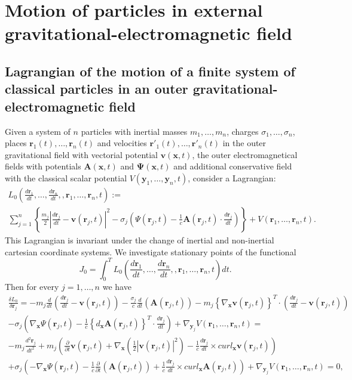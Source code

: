 \documentclass{article}
\theoremstyle{definition}
\theoremstyle{remark}
\renewcommand{\vec}[1]{\mathbf{#1}}
\begin{document}
\section{Motion of particles in external gravitational-electromagnetic field}
\subsection{Lagrangian of the motion of a finite system of classical
particles in an outer gravitational-electromagnetic
field}\label{hggyugyuy} Given a system of $n$ particles with
inertial masses $m_1,\ldots,m_n$, charges
$\sigma_1,\ldots,\sigma_n$, places $\vec r_1(t),\ldots,\vec r_n(t)$
and velocities $\vec r'_1(t),\ldots, \vec r'_n(t)$ in the outer
gravitational field with vectorial potential $\vec v(\vec x,t)$, the
outer electromagnetical fields with potentials $\vec A(\vec x,t)$
and $\vec \Psi(\vec x,t)$ and additional conservative field with the
classical scalar potential $V(\vec y_1,\ldots,\vec y_n,t)$, consider
a Lagrangian:
\begin{multline}\label{vhfffngghkjgghfjjSYSPN}
L_0\left(\frac{d\vec r_1}{dt},\ldots,\frac{d\vec r_n}{dt},,\vec
r_1,\ldots,\vec r_n,t\right):=\\
\sum_{j=1}^{n}\left\{\frac{m_j}{2}\left|\frac{d\vec r_j}{dt}-\vec
v(\vec r_j,t)\right|^2-\sigma_j\left(\Psi(\vec
r_j,t)-\frac{1}{c}\vec A(\vec r_j,t)\cdot\frac{d\vec
r_j}{dt}\right)\right\}+V\left(\vec r_1,\ldots,\vec r_n,t\right).
\end{multline}
This Lagrangian is invariant under the change of inertial and
non-inertial cartesian coordinate systems. We investigate stationary
points of the functional
\begin{equation}\label{btfffygtgyggyijhhkkSYSPN}
J_0=\int_0^T L_0\left(\frac{d\vec r_1}{dt},\ldots,\frac{d\vec
r_n}{dt},,\vec r_1,\ldots,\vec r_n,t\right)dt.
\end{equation}
Then for every $j=1,\ldots,n$ we have
\begin{multline}\label{vhfffngghkjgghggtghjgfhjoyuiyuyhiyyukukySYSPN}
\frac{\delta L_0}{\delta \vec r_j}=-m_j\frac{d}{dt}\left(\frac{d\vec
r_j}{dt}-\vec v(\vec
r_j,t)\right)-\frac{\sigma_j}{c}\frac{d}{dt}\left(\vec A(\vec
r_j,t)\right)-m_j\left\{\nabla_{\vec x}\vec v(\vec
r_j,t)\right\}^T\cdot\left(\frac{d\vec r_j}{dt}-\vec v(\vec
r_j,t)\right)\\-\sigma_j\left(\nabla_{\vec x}\Psi(\vec
r_j,t)-\frac{1}{c}\left\{d_{\vec x}\vec A(\vec
r_j,t)\right\}^T\cdot\frac{d\vec r_j}{dt}\right)+\nabla_{\vec
y_j}V\left(\vec r_1,\ldots,\vec r_n,t\right)=\\-m_j\frac{d^2\vec
r_j}{dt^2}+m_j\left(\frac{\partial}{\partial t}\vec v(\vec
r_j,t)+\nabla_{\vec x}\left(\frac{1}{2}\left|\vec v(\vec
r_j,t)\right|^2\right)-\frac{1}{c}\frac{d\vec r_j}{dt}\times
curl_{\vec x}\vec v(\vec r_j,t)\right)\\+\sigma_j\left(-\nabla_{\vec
x}\Psi(\vec r_j,t)-\frac{1}{c}\frac{\partial}{\partial t}\left(\vec
A(\vec r_j,t)\right)+\frac{1}{c}\frac{d\vec r_j}{dt}\times
curl_{\vec x}\vec A(\vec r_j,t)\right)+\nabla_{\vec y_j}V\left(\vec
r_1,\ldots,\vec r_n,t\right)=0,
\end{multline}
\end{document}
